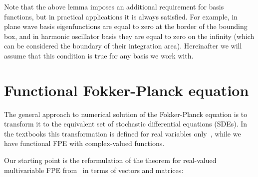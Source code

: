 \documentclass[12pt,aip,jmp,amssymb,amsmath]{revtex4-1}
\begin{document}
Note that the above lemma imposes an additional requirement for basis functions, but in practical applications it is always satisfied.
For example, in plane wave basis eigenfunctions are equal to zero at the border of the bounding box, and in harmonic oscillator basis they are equal to zero on the infinity (which can be considered the boundary of their integration area).
Hereinafter we will assume that this condition is true for any basis we work with.



\section{Functional Fokker-Planck equation}

The general approach to numerical solution of the Fokker-Planck equation is to transform it to the equivalent set of stochastic differential equations (SDEs).
In the textbooks this transformation is defined for real variables only~\cite{Risken1996}, while we have functional FPE with complex-valued functions.

Our starting point is the reformulation of the theorem for real-valued multivariable FPE from~\cite{Risken1996} in terms of vectors and matrices:
\end{document}
